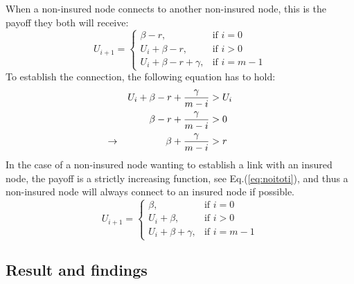 When a non-insured node connects to another non-insured node, this is the payoff they both will receive:
\begin{equation}
    U_{i+1}= 
\begin{cases}
     \beta -r,& \text{if } i = 0\\
    U_{i}+\beta -r,& \text{if }  i>0\\
    U_{i}+\beta -r +\gamma,& \text{if } i=m-1
\end{cases}
\label{eq:noitonoti}
\end{equation}
To establish the connection, the following equation has to hold:
\begin{eqnarray}
U_{i}+\beta-r+\frac{\gamma}{m-i}&>U_{i} \nonumber \\ 
\beta-r+\frac{\gamma}{m-i}&>0 \nonumber \\ 
\llap{$\rightarrow$\hspace{50pt}} \beta+\frac{\gamma}{m-i}&>r
\end{eqnarray}
In the case of a non-insured node wanting to establish a link with an insured node, the payoff is a strictly increasing function, see Eq.(\ref{eq:noitoti}), and thus a non-insured node will always connect to an insured node if possible.
\begin{equation}
    U_{i+1}= 
\begin{cases}
    \beta,& \text{if } i = 0\\
    U_{i}+\beta,& \text{if }  i>0\\
    U_{i}+\beta +\gamma,& \text{if } i=m-1
\end{cases}
\label{eq:noitoti}
\end{equation}

\subsection{Result and findings}

